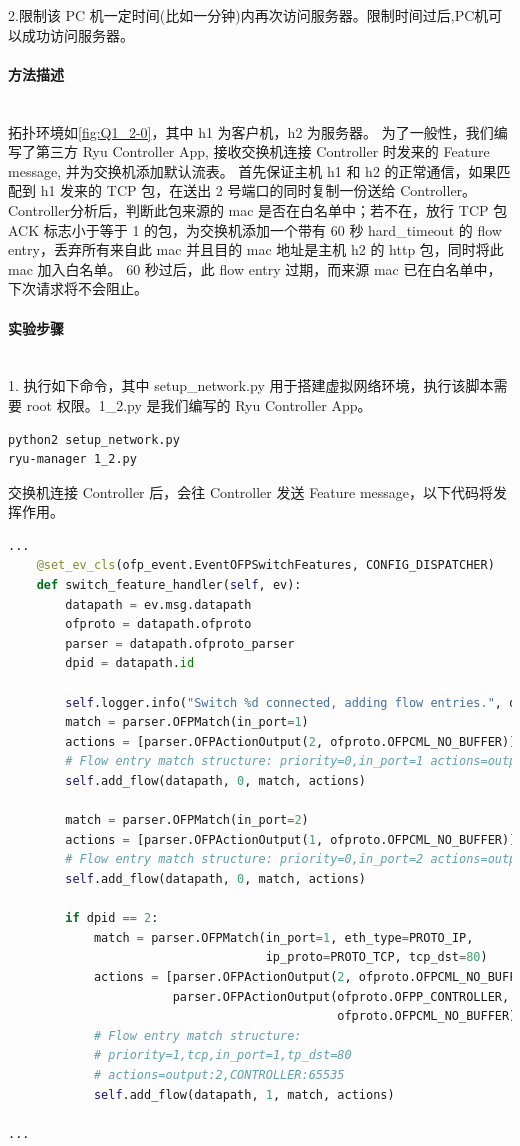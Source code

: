 \documentclass[format=draft,language=chinese,category=SDN]{hustreport}
\newcommand{\myparagraph}[1]{\paragraph{#1}\mbox{}\\}
\begin{document}
2.限制该 PC 机一定时间(比如一分钟)内再次访问服务器。限制时间过后,PC机可以成功访问服务器。

\myparagraph{方法描述}

拓扑环境如\autoref{fig:Q1_2-0}，其中 h1 为客户机，h2 为服务器。
为了一般性，我们编写了第三方 Ryu Controller App, 接收交换机连接 Controller 时发来的 Feature message, 并为交换机添加默认流表。
首先保证主机 h1 和 h2 的正常通信，如果匹配到 h1 发来的 TCP 包，在送出 2 号端口的同时复制一份送给 Controller。
Controller分析后，判断此包来源的 mac 是否在白名单中；若不在，放行 TCP 包 ACK 标志小于等于 1 的包，为交换机添加一个带有 60 秒 hard\_timeout 的 flow entry，丢弃所有来自此 mac 并且目的 mac 地址是主机 h2 的 http 包，同时将此 mac 加入白名单。
60 秒过后，此 flow entry 过期，而来源 mac 已在白名单中，下次请求将不会阻止。

\myparagraph{实验步骤}

1. 执行如下命令，其中 setup\_network.py 用于搭建虚拟网络环境，执行该脚本需要 root 权限。1\_2.py 是我们编写的 Ryu Controller App。

\begin{lstlisting}
python2 setup_network.py
ryu-manager 1_2.py
\end{lstlisting}

交换机连接 Controller 后，会往 Controller 发送 Feature message，以下代码将发挥作用。

\begin{lstlisting}[language=python]
...
    @set_ev_cls(ofp_event.EventOFPSwitchFeatures, CONFIG_DISPATCHER)
    def switch_feature_handler(self, ev):
        datapath = ev.msg.datapath
        ofproto = datapath.ofproto
        parser = datapath.ofproto_parser
        dpid = datapath.id

        self.logger.info("Switch %d connected, adding flow entries.", dpid)
        match = parser.OFPMatch(in_port=1)
        actions = [parser.OFPActionOutput(2, ofproto.OFPCML_NO_BUFFER)]
        # Flow entry match structure: priority=0,in_port=1 actions=output:2
        self.add_flow(datapath, 0, match, actions)

        match = parser.OFPMatch(in_port=2)
        actions = [parser.OFPActionOutput(1, ofproto.OFPCML_NO_BUFFER)]
        # Flow entry match structure: priority=0,in_port=2 actions=output:1
        self.add_flow(datapath, 0, match, actions)

        if dpid == 2:
            match = parser.OFPMatch(in_port=1, eth_type=PROTO_IP,
                                    ip_proto=PROTO_TCP, tcp_dst=80)
            actions = [parser.OFPActionOutput(2, ofproto.OFPCML_NO_BUFFER),
                       parser.OFPActionOutput(ofproto.OFPP_CONTROLLER,
                                              ofproto.OFPCML_NO_BUFFER)]
            # Flow entry match structure:
            # priority=1,tcp,in_port=1,tp_dst=80
            # actions=output:2,CONTROLLER:65535
            self.add_flow(datapath, 1, match, actions)

...
\end{lstlisting}
\end{document}
